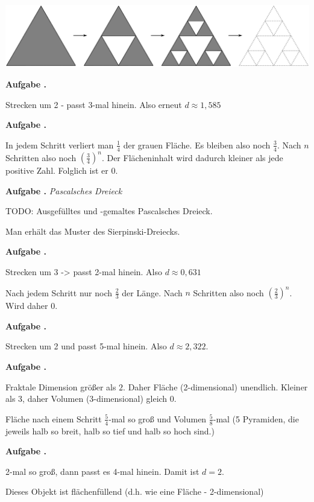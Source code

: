 \documentclass[a4paper,ngerman,12pt]{scrartcl}
\theoremstyle{definition}
\theoremstyle{plain}
\theoremstyle{remark}
\newlength{\aufgabenskip}
\newcounter{aufgabennummer}
\newenvironment{aufgabe}[1]{
  \addtocounter{aufgabennummer}{1}
  \textbf{Aufgabe \theaufgabennummer.} \emph{#1} \par
}{\vspace{\aufgabenskip}}
\begin{document}
\begin{center}
	\includegraphics[width=.7\textwidth]{Bilder/Sierpinski-Konstruktion.pdf}
\end{center}

\begin{aufgabe}{}\label{aufgabe:Sierpinski-Flaeche}
	Strecken um 2 - passt 3-mal hinein. Also erneut $d \approx 1,585$
\end{aufgabe}

\begin{aufgabe}{}
	In jedem Schritt verliert man $\frac{1}{4}$ der grauen Fläche. Es bleiben also noch $\frac{3}{4}$. Nach $n$ Schritten also noch $\left(\frac{3}{4}\right)^n$. Der Flächeninhalt wird dadurch kleiner als jede positive Zahl. Folglich ist er $0$.
\end{aufgabe}

\begin{aufgabe}{Pascalsches Dreieck}
	TODO: Ausgefülltes und -gemaltes Pascalsches Dreieck.
	
	Man erhält das Muster des Sierpinski-Dreiecks.
\end{aufgabe}

\begin{aufgabe}{}
	Strecken um 3 -> passt 2-mal hinein. Also $d \approx 0,631$
	
	Nach jedem Schritt nur noch $\frac{2}{3}$ der Länge. Nach $n$ Schritten also noch $\left(\frac{2}{3}\right)^n$. Wird daher 0.
\end{aufgabe}

\begin{aufgabe}{}
	Strecken um 2 und passt 5-mal hinein. Also $d \approx 2,322$.
\end{aufgabe}
	
\begin{aufgabe}{}
	Fraktale Dimension größer als $2$. Daher Fläche (2-dimensional) unendlich. Kleiner als $3$, daher Volumen (3-dimensional) gleich 0.
	
	Fläche nach einem Schritt $\frac{5}{4}$-mal so groß und Volumen $\frac{5}{8}$-mal (5 Pyramiden, die jeweils halb so breit, halb so tief und halb so hoch sind.)
\end{aufgabe}

\begin{aufgabe}{}
	2-mal so groß, dann passt es 4-mal hinein. Damit ist $d = 2$. 
	
	Dieses Objekt ist flächenfüllend (d.h. wie eine Fläche - 2-dimensional)
\end{aufgabe}
\end{document}
